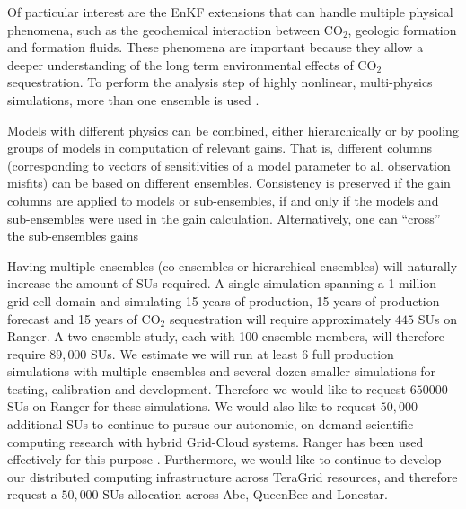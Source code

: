 \documentclass[a4paper,10pt]{article}
\begin{document}
Of particular interest are the EnKF extensions that can handle multiple physical phenomena,
such as the geochemical interaction between CO$_2$, geologic formation and formation fluids.
These phenomena are important because they allow a deeper understanding
of the long term environmental effects of CO$_2$ sequestration. To perform the analysis
step of highly nonlinear, multi-physics simulations, more than one ensemble is used 
\cite{Zhang,White1987,Durlofsky1992,Ballin1993,Gilks96,vanLeeuwen2003}.

Models with different physics can be combined, either hierarchically or by pooling 
groups of models in computation of relevant gains. That is, different  columns (corresponding to  
vectors of sensitivities of a model parameter to all observation misfits) can be based on different 
ensembles. Consistency is preserved if the gain columns are applied to models or sub-ensembles,
if and only if the models and sub-ensembles were used in the gain calculation. Alternatively, one 
can ``cross''  the sub-ensembles gains \cite{Mitchell02,Anderson2007,Michalak2003}

Having multiple ensembles (co-ensembles or hierarchical ensembles) will naturally increase the
amount of SUs required. A single simulation spanning a 1 million grid cell domain and simulating
15 years of production, 15 years of production forecast and 15 years of CO$_2$ sequestration will
require approximately $445$ SUs on Ranger. A two ensemble study, each with 100 ensemble members, 
will therefore require $89,000$ SUs. We estimate we will run at least $6$ full production 
simulations with multiple ensembles and several dozen smaller simulations for testing, calibration
and development. Therefore we would like to request $650000$ SUs on Ranger for these simulations. 
We would also like to request $50,000$ additional SUs to continue to pursue our autonomic,
on-demand scientific computing research with hybrid Grid-Cloud systems. Ranger has been
used effectively for this purpose \cite{Cloud1,Cloud2}. Furthermore, we would like to
continue to develop our distributed computing infrastructure across TeraGrid resources,
and therefore request a $50,000$ SUs allocation across Abe, QueenBee and Lonestar.

\end{document}
